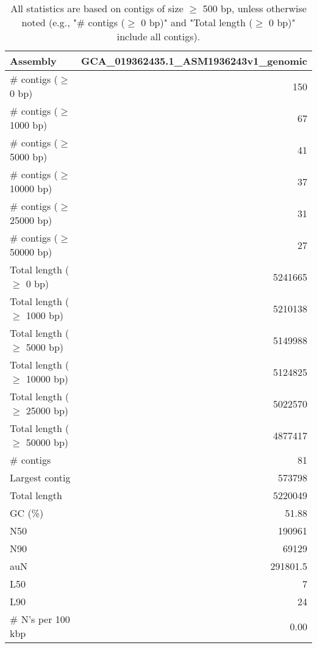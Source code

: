 \documentclass[12pt,a4paper]{article}
\begin{document}
\begin{table}[ht]
\begin{center}
\caption{All statistics are based on contigs of size $\geq$ 500 bp, unless otherwise noted (e.g., "\# contigs ($\geq$ 0 bp)" and "Total length ($\geq$ 0 bp)" include all contigs).}
\begin{tabular}{|l*{1}{|r}|}
\hline
Assembly & GCA\_019362435.1\_ASM1936243v1\_genomic \\ \hline
\# contigs ($\geq$ 0 bp) & 150 \\ \hline
\# contigs ($\geq$ 1000 bp) & 67 \\ \hline
\# contigs ($\geq$ 5000 bp) & 41 \\ \hline
\# contigs ($\geq$ 10000 bp) & 37 \\ \hline
\# contigs ($\geq$ 25000 bp) & 31 \\ \hline
\# contigs ($\geq$ 50000 bp) & 27 \\ \hline
Total length ($\geq$ 0 bp) & 5241665 \\ \hline
Total length ($\geq$ 1000 bp) & 5210138 \\ \hline
Total length ($\geq$ 5000 bp) & 5149988 \\ \hline
Total length ($\geq$ 10000 bp) & 5124825 \\ \hline
Total length ($\geq$ 25000 bp) & 5022570 \\ \hline
Total length ($\geq$ 50000 bp) & 4877417 \\ \hline
\# contigs & 81 \\ \hline
Largest contig & 573798 \\ \hline
Total length & 5220049 \\ \hline
GC (\%) & 51.88 \\ \hline
N50 & 190961 \\ \hline
N90 & 69129 \\ \hline
auN & 291801.5 \\ \hline
L50 & 7 \\ \hline
L90 & 24 \\ \hline
\# N's per 100 kbp & 0.00 \\ \hline
\end{tabular}
\end{center}
\end{table}
\end{document}
